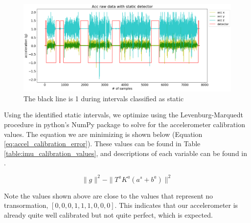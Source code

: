 \documentclass{article}
\begin{document}
    \begin{figure}[H]
      \centering
      \includegraphics[width=1\linewidth]{./images/static_detector.png}
      \caption{The black line is 1 during intervals classified as static}
      \label{fig:static_detector}
    \end{figure}

    Using the identified static intervals, we optimize using the Levenburg-Marquedt procedure in python's NumPy package to solve for the accelerometer calibration values. The equation we are minimizing is shown below (Equation \ref{eq:accel_calibration_error}). These values can be found in Table \ref{table:imu_calibration_values}, and descriptions of each variable can be found in \cite{tedaldi_robust_2014}.

    \begin{equation} \label{eq:accel_calibration_error}
      \rVert g\lVert^2 - \rVert T^aK^a(a^s+b^a)\lVert^2
    \end{equation}

    \begin{table}[H]
      \centering
      \caption{IMU Calibration Values}
      \label{table:imu_calibration_values}
    \end{table}

    Note the values shown above are close to the values that represent no transormation, $[0, 0, 0, 1, 1, 1, 0, 0, 0]$. This indicates that our accelerometer is already quite well calibrated but not quite perfect, which is expected.
\end{document}
